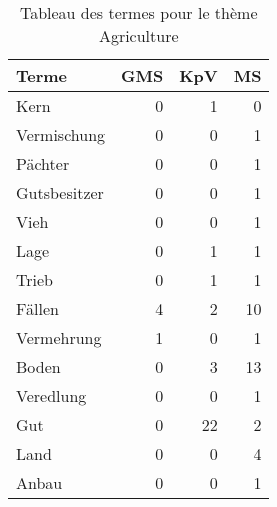 
\begin{table}[ht]
\centering
\caption{Tableau des termes pour le thème Agriculture}
\label{tab:Agriculture}
\begin{tabular}{lrrr}
\hline
 Terme        &   GMS &   KpV &   MS \\
\hline
 Kern         &     0 &     1 &    0 \\
 Vermischung  &     0 &     0 &    1 \\
 Pächter      &     0 &     0 &    1 \\
 Gutsbesitzer &     0 &     0 &    1 \\
 Vieh         &     0 &     0 &    1 \\
 Lage         &     0 &     1 &    1 \\
 Trieb        &     0 &     1 &    1 \\
 Fällen       &     4 &     2 &   10 \\
 Vermehrung   &     1 &     0 &    1 \\
 Boden        &     0 &     3 &   13 \\
 Veredlung    &     0 &     0 &    1 \\
 Gut          &     0 &    22 &    2 \\
 Land         &     0 &     0 &    4 \\
 Anbau        &     0 &     0 &    1 \\
\hline
\end{tabular}
\end{table}
    